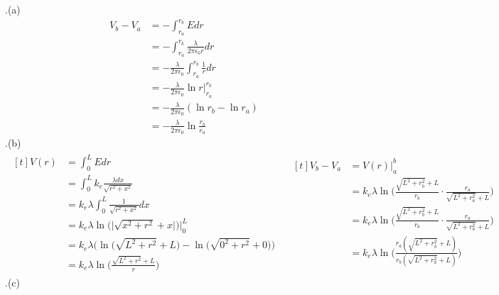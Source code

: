 \documentclass[11pt]{article}
\begin{document}
.(a)
\begin{align*}
V_b - V_a &= - \int_{r_a}^{r_b} E dr \\
          &= - \int_{r_a}^{r_b} \frac{\lambda}{2 \pi \epsilon_0 r} dr \\
          &= - \frac{\lambda}{2 \pi \epsilon_0} \int_{r_a}^{r_b} \frac{1}{r} dr \\
          &= - \frac{\lambda}{2 \pi \epsilon_0} \ln{r} \big|_{r_a}^{r_b} \\
          &= - \frac{\lambda}{2 \pi \epsilon_0} (\ln{r_b} - \ln{r_a}) \\
          &= - \frac{\lambda}{2 \pi \epsilon_0} \ln{\frac{r_{b}}{r_a}}
\end{align*}
.(b)
\begin{align*}
\begin{aligned}[t]
V(r) &= \int_{0}^{L} E dr \\
     &= \int_{0}^{L} k_e \frac{\lambda dx}{\sqrt{r^2 + x^2}} \\
     &= k_e \lambda \int_{0}^{L} \frac{1}{\sqrt{r^2 + x^2}} dx \\
     &= k_e \lambda \ln \big(\big| \sqrt{x^2 + r^2} + x \big|\big)  \bigg|_{0}^{L} \\
     &= k_e \lambda \bigg( \ln \big( \sqrt{L^2 + r^2} + L \big) - \ln \big( \sqrt{0^2 + r^2} + 0 \big) \bigg) \\
     &= k_e \lambda \ln \bigg( \frac{ \sqrt{L^2 + r^2} + L }{r} \bigg)
\end{aligned}
\quad
\begin{aligned}[t]
V_b - V_a &= V(r) \big|_a^b \\
          &= k_e \lambda \ln \bigg( \frac{ \sqrt{L^2 + r_b^2} + L }{r_b} \cdot \frac{r_a}{ \sqrt{L^2 + r_a^2} + L }\bigg) \\
          &= k_e \lambda \ln \bigg( \frac{ \sqrt{L^2 + r_b^2} + L }{r_b} \cdot \frac{r_a}{ \sqrt{L^2 + r_a^2} + L }\bigg) \\
          &= k_e \lambda \ln \bigg( \frac{ r_a (\sqrt{L^2 + r_b^2} + L )}{r_b (\sqrt{L^2 + r_a^2} + L)} \bigg)
\end{aligned}
\end{align*}
\newline
{}.(c) \\
\end{document}
